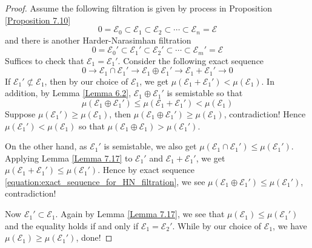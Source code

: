 \documentclass{ctexart}
\begin{document}
\begin{proof}
    Assume the following filtration is given by process in Proposition \ref{Proposition 7.10}
    \begin{equation}
        0 = \mathcal{E}_{0} \subset \mathcal{E}_{1} \subset \mathcal{E}_{2} \subset \cdots \subset \mathcal{E}_{n} = \mathcal{E}
    \end{equation}
    and there is another Harder-Narasimhan filtration
    \begin{equation}
        0 = \mathcal{E}_{0}' \subset \mathcal{E}_{1}' \subset \mathcal{E}_{2}' \subset \cdots \subset \mathcal{E}_{m}' = \mathcal{E}
    \end{equation}
    Suffices to check that $\mathcal{E}_{1} = \mathcal{E}_{1}'$.
    Consider the following exact sequence
    \begin{equation}
        0 \longrightarrow \mathcal{E}_{1} \cap \mathcal{E}_{1}' \longrightarrow \mathcal{E}_{1} \oplus \mathcal{E}_{1}' \longrightarrow \mathcal{E}_{1} + \mathcal{E}_{1}' \longrightarrow 0
        \label{equation:exact_sequence_for_HN_filtration}
    \end{equation}
    If $\mathcal{E}_{1}' \not\subset \mathcal{E}_{1}$, then by our choice of $\mathcal{E}_{1}$,
    we get $\mu(\mathcal{E}_{1} + \mathcal{E}_{1}') < \mu(\mathcal{E}_{1})$.
    In addition, by Lemma \ref{Lemma 6.2}, $\mathcal{E}_{1} \oplus \mathcal{E}_{1}'$ is semistable so that 
    \begin{equation}
        \mu(\mathcal{E}_{1} \oplus \mathcal{E}_{1}') \le \mu(\mathcal{E}_{1} + \mathcal{E}_{1}') < \mu(\mathcal{E}_{1})
    \end{equation}    
    Suppose $\mu(\mathcal{E}_{1}') \ge \mu(\mathcal{E}_{1})$, then $\mu(\mathcal{E}_{1} \oplus \mathcal{E}_{1}') \ge \mu(\mathcal{E}_{1})$, contradiction!
    Hence $\mu(\mathcal{E}_{1}') < \mu(\mathcal{E}_{1})$ so that $\mu(\mathcal{E}_{1} \oplus \mathcal{E}_{1}) > \mu(\mathcal{E}_{1}')$.
    \par
    On the other hand, as $\mathcal{E}_{1}'$ is semistable,
    we also get $\mu(\mathcal{E}_{1} \cap \mathcal{E}_{1}') \le \mu(\mathcal{E}_{1}')$.
    Applying Lemma \ref{Lemma 7.17} to $\mathcal{E}_{1}'$ and $\mathcal{E}_{1} + \mathcal{E}_{1}'$, we get $\mu(\mathcal{E}_{1} + \mathcal{E}_{1}') \le \mu(\mathcal{E}_{1}')$.
    Hence by exact sequence \ref{equation:exact_sequence_for_HN_filtration}, we see $\mu(\mathcal{E}_{1} \oplus \mathcal{E}_{1}') \le \mu(\mathcal{E}_{1}')$, contradiction!
    \par
    Now $\mathcal{E}_{1}' \subset \mathcal{E}_{1}$.
    Again by Lemma \ref{Lemma 7.17}, we see that $\mu(\mathcal{E}_{1}) \le \mu(\mathcal{E}_{1}')$ and the equality holds if and only if $\mathcal{E}_{1} = \mathcal{E}_{2}'$.
    While by our choice of $\mathcal{E}_{1}$, we have $\mu(\mathcal{E}_{1}) \ge \mu(\mathcal{E}_{1}')$, done!
\end{proof}
\end{document}
